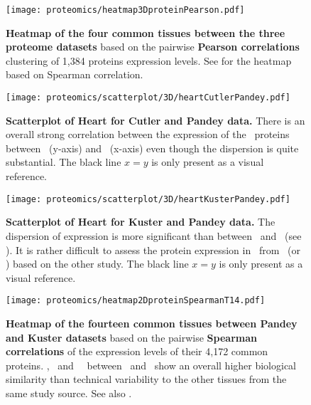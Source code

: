 \begin{figure}[!htbp]
    \texttt{[image: proteomics/heatmap3DproteinPearson.pdf]}\centering
    \vspace{-4mm}
    \caption[Heatmap of the 4 common tissues between the three proteome
    datasets (Pearson correlation)]{\label{fig:prot3DheatmapPears}\textbf{Heatmap
    of the four common tissues between the three proteome datasets}
    based on the pairwise \textbf{Pearson correlations} clustering of
    1,384 proteins expression levels.
    See  for the heatmap based on Spearman correlation.}
\end{figure}

\begin{figure}[!htpb]
    \texttt{[image: proteomics/scatterplot/3D/heartCutlerPandey.pdf]}\centering
    \caption[Heart: Cutler vs Pandey]{\label{fig:scat3DheartCutlerPandey}\textbf{%
    Scatterplot of Heart for Cutler and Pandey data.}
    There is an overall strong correlation between
    the expression of the \heart\ proteins
    between \pandey\ (y-axis) and \cutler\ (x-axis)
    even though the dispersion is quite substantial.
    {\small The black line $x=y$ is only present as a visual reference.}}
\end{figure}

\begin{figure}[!htpb]
    \texttt{[image: proteomics/scatterplot/3D/heartKusterPandey.pdf]}\centering
    \caption[Heart: Kuster vs Pandey]{\label{fig:scat3DheartKusterPandey}\textbf{%
    Scatterplot of Heart for Kuster and Pandey data.}
    The dispersion of expression is more significant than between \pandey\ and \cutler\
    (see ).
    It is rather difficult to assess the protein expression in \Heart\ from
    \pandey\ (or \kuster) based on the other study.
    {\small The black line $x=y$ is only present as a visual reference.}}
\end{figure}

\begin{figure}[!htpb]
    \texttt{[image: proteomics/heatmap2DproteinSpearmanT14.pdf]}\centering
    \caption[Heatmap of the 14 common tissues between Pandey and Kuster datasets
    (Spearman correlation)]{\label{fig:prot2DheatmapT14}\textbf{Heatmap of
    the fourteen common tissues between Pandey and Kuster datasets}
    based on the pairwise \textbf{Spearman correlations} of the expression levels of
    their 4,172 common proteins.
    \Placenta, \Lung\ and \Kidney\ \treps\ between \pandey\ and \kuster\ show
    an overall higher biological similarity than technical variability
    to the other tissues from the same study source.
    See also .}
\end{figure}


